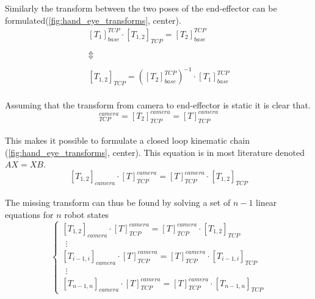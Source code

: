 \noindent Similarly the transform between the two poses of the end-effector can be formulated(\ref{fig:hand_eye_transforms}, center).\\

\begin{equation}
\begin{matrix}
[T_{1}]_{base}^{TCP} \cdot [T_{1,2}]_{TCP} = [T_{2}]_{base}^{TCP} \\ 
\\ 
\Updownarrow \\ 
\\ 
[T_{1,2}]_{TCP} = ([T_{2}]_{base}^{TCP})^{-1} \cdot  [T_{1}]_{base}^{TCP}
\end{matrix}
\end{equation}\\ 

\noindent Assuming that the transform from camera to end-effector is static it is clear that.\\

\begin{equation}
[T_{1}]_{TCP}^{camera} = [T_{2}]_{TCP}^{camera} = [T]_{TCP}^{camera}
\end{equation}\\ 

\noindent This makes it possible to formulate a closed loop kinematic chain (\ref{fig:hand_eye_transforms}, center). This equation is in most literature denoted $ AX=XB $. \\

\begin{equation} \label{equ:closed_loop}
	[T_{1,2}]_{camera} \cdot [T]_{TCP}^{camera} = [T]_{TCP}^{camera} \cdot [T_{1,2}]_{TCP}
\end{equation}\\ 

\noindent The missing transform can thus be found by solving a set of $ n-1 $ linear equations for $ n $ robot states \\

\begin{equation} \label{eq:linear_equations}
\left\{\begin{matrix}
[T_{1,2}]_{camera} \cdot [T]_{TCP}^{camera} = [T]_{TCP}^{camera} \cdot [T_{1,2}]_{TCP} \\ 
\ \ \vdots 
\\ 
[T_{i-1,i}]_{camera} \cdot [T]_{TCP}^{camera} = [T]_{TCP}^{camera} \cdot [T_{i-1,i}]_{TCP}\\ 
\ \ \vdots 
\\ 
[T_{n-1,n}]_{camera} \cdot [T]_{TCP}^{camera} = [T]_{TCP}^{camera} \cdot [T_{n-1,n}]_{TCP}
\end{matrix}\right.
\end{equation}\\ 

